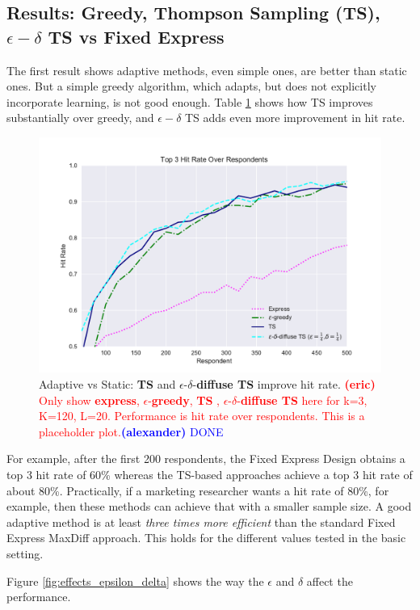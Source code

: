 \documentclass[nonblindrev]{informs3}
\newcommand{\alexander}[1]{\textcolor{blue}{\textbf{(alexander)} #1}}
\newcommand{\eric}[1]{\textcolor{red}{\textbf{(eric)} #1}}
\newcommand{\fixedexpress}{\textbf{express}}
\newcommand{\egreedy}{$\epsilon$-\textbf{greedy}}
\newcommand{\ts}{\textbf{TS} }
\newcommand{\edts}{$\epsilon$-$\delta$-\textbf{diffuse TS} }
\begin{document}
\subsection{Results: Greedy, Thompson Sampling (TS), $\epsilon-\delta$ TS vs Fixed Express}

The first result shows adaptive methods, even simple ones, are better than static ones. But a simple greedy algorithm, which adapts, but does not explicitly incorporate learning, is not good enough. Table \ref{fig:simple_result} shows how TS improves substantially over greedy, and $\epsilon-\delta$ TS adds even more improvement in hit rate.

\begin{figure}
\caption{Adaptive vs Static: \ts and \edts improve hit rate. \eric{Only show \fixedexpress, \egreedy, \ts, \edts here for k=3, K=120, L=20. Performance is hit rate over respondents. This is a placeholder plot.}\alexander{DONE} }
\label{fig:simple_result}
\begin{center}
	\includegraphics[width=.8\textwidth]{plots/hr120v20k3.pdf}
\end{center}
\end{figure}

For example, after the first 200 respondents, the Fixed Express Design obtains a top 3 hit rate of 60\% whereas the TS-based approaches achieve a top 3 hit rate of about 80\%. Practically, if a marketing researcher wants a hit rate of 80\%, for example, then these methods can achieve that with a smaller sample size. A good adaptive method is at least \emph{three times more efficient} than the standard Fixed Express MaxDiff approach. This holds for the different values tested in the basic setting. 

Figure \ref{fig:effects_epsilon_delta} shows the way the $\epsilon$ and $\delta$ affect the performance. 
\end{document}
